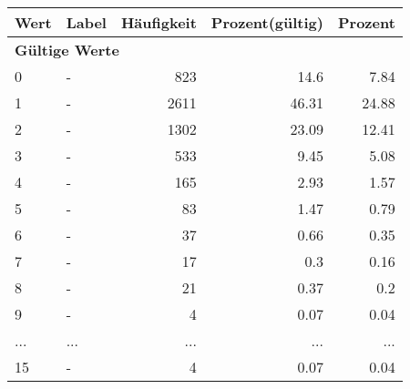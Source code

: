      \begin{longtable}{lXrrr}
     \toprule
     \textbf{Wert} & \textbf{Label} & \textbf{Häufigkeit} & \textbf{Prozent(gültig)} & \textbf{Prozent} \\
     \endhead
     \midrule
     \multicolumn{5}{l}{\textbf{Gültige Werte}}\\
        0 & \multicolumn{1}{X}{-} & %
          \num{823} &
          \num[round-mode=places,round-precision=2]{14,6} &
          \num[round-mode=places,round-precision=2]{7,84} \\
        1 & \multicolumn{1}{X}{-} & %
          \num{2611} &
          \num[round-mode=places,round-precision=2]{46,31} &
          \num[round-mode=places,round-precision=2]{24,88} \\
        2 & \multicolumn{1}{X}{-} & %
          \num{1302} &
          \num[round-mode=places,round-precision=2]{23,09} &
          \num[round-mode=places,round-precision=2]{12,41} \\
        3 & \multicolumn{1}{X}{-} & %
          \num{533} &
          \num[round-mode=places,round-precision=2]{9,45} &
          \num[round-mode=places,round-precision=2]{5,08} \\
        4 & \multicolumn{1}{X}{-} & %
          \num{165} &
          \num[round-mode=places,round-precision=2]{2,93} &
          \num[round-mode=places,round-precision=2]{1,57} \\
        5 & \multicolumn{1}{X}{-} & %
          \num{83} &
          \num[round-mode=places,round-precision=2]{1,47} &
          \num[round-mode=places,round-precision=2]{0,79} \\
        6 & \multicolumn{1}{X}{-} & %
          \num{37} &
          \num[round-mode=places,round-precision=2]{0,66} &
          \num[round-mode=places,round-precision=2]{0,35} \\
        7 & \multicolumn{1}{X}{-} & %
          \num{17} &
          \num[round-mode=places,round-precision=2]{0,3} &
          \num[round-mode=places,round-precision=2]{0,16} \\
        8 & \multicolumn{1}{X}{-} & %
          \num{21} &
          \num[round-mode=places,round-precision=2]{0,37} &
          \num[round-mode=places,round-precision=2]{0,2} \\
        9 & \multicolumn{1}{X}{-} & %
          \num{4} &
          \num[round-mode=places,round-precision=2]{0,07} &
          \num[round-mode=places,round-precision=2]{0,04} \\
       ... & ... & ... & ... & ... \\
        15 & \multicolumn{1}{X}{-} & %
          \num{4} &
          \num[round-mode=places,round-precision=2]{0,07} &
          \num[round-mode=places,round-precision=2]{0,04} \\


\end{longtable}
